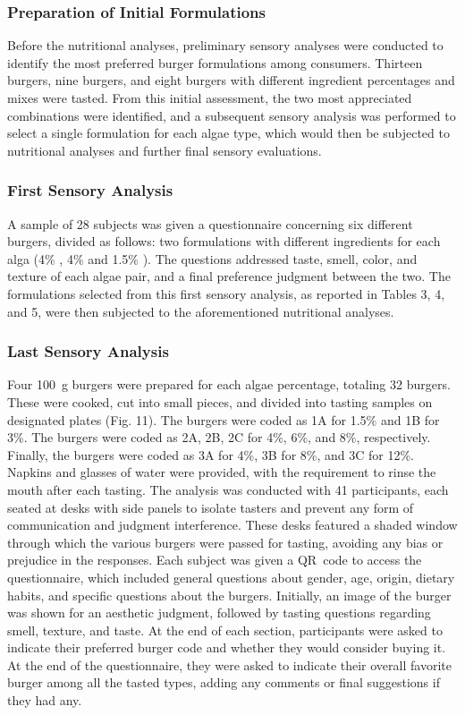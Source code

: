 \subsubsection{Preparation of Initial Formulations}
Before the nutritional analyses, preliminary sensory analyses were conducted to identify the most preferred burger formulations among consumers. Thirteen  burgers, nine  burgers, and eight  burgers with different ingredient percentages and mixes were tasted. From this initial assessment, the two most appreciated combinations were identified, and a subsequent sensory analysis was performed to select a single formulation for each algae type, which would then be subjected to nutritional analyses and further final sensory evaluations.

\subsubsection{First Sensory Analysis}
A sample of 28 subjects was given a questionnaire concerning six different burgers, divided as follows: two formulations with different ingredients for each alga (4\% , 4\%  and 1.5\% ). The questions addressed taste, smell, color, and texture of each algae pair, and a final preference judgment between the two.
The formulations selected from this first sensory analysis, as reported in Tables 3, 4, and 5, were then subjected to the aforementioned nutritional analyses.

\subsubsection{Last Sensory Analysis}
Four \qty{100}{\gram} burgers were prepared for each algae percentage, totaling 32 burgers. These were cooked, cut into small pieces, and divided into tasting samples on designated plates (Fig. 11). The  burgers were coded as 1A for 1.5\% and 1B for 3\%. The  burgers were coded as 2A, 2B, 2C for 4\%, 6\%, and 8\%, respectively. Finally, the  burgers were coded as 3A for 4\%, 3B for 8\%, and 3C for 12\%.
Napkins and glasses of water were provided, with the requirement to rinse the mouth after each tasting. The analysis was conducted with 41 participants, each seated at desks with side panels to isolate tasters and prevent any form of communication and judgment interference. These desks featured a shaded window through which the various burgers were passed for tasting, avoiding any bias or prejudice in the responses. Each subject was given a QR~code to access the questionnaire, which included general questions about gender, age, origin, dietary habits, and specific questions about the burgers. Initially, an image of the burger was shown for an aesthetic judgment, followed by tasting questions regarding smell, texture, and taste. At the end of each section, participants were asked to indicate their preferred burger code and whether they would consider buying it. At the end of the questionnaire, they were asked to indicate their overall favorite burger among all the tasted types, adding any comments or final suggestions if they had any.

